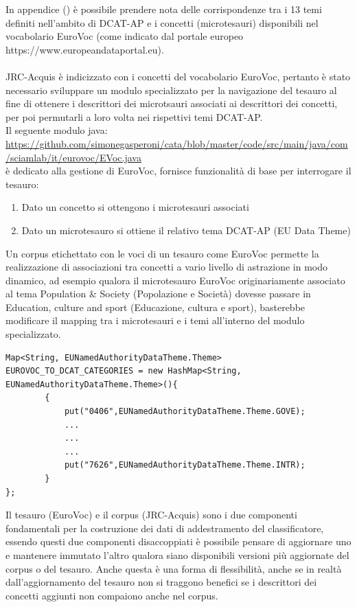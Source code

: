 \documentclass{article}
\theoremstyle{plain}
\theoremstyle{definition}
\begin{document}
In appendice () è possibile prendere nota delle corrispondenze tra i 13 temi definiti nell'ambito di DCAT-AP e i concetti (microtesauri) disponibili nel vocabolario EuroVoc (come indicato dal portale europeo https://www.europeandataportal.eu).
\\
\\
JRC-Acquis è indicizzato con i concetti del vocabolario EuroVoc, pertanto è stato necessario sviluppare un modulo specializzato per la navigazione del tesauro al fine di ottenere i descrittori dei microtsauri associati ai descrittori dei concetti, per poi permutarli a loro volta nei rispettivi temi DCAT-AP.
\\
Il seguente modulo java:
\url{https://github.com/simonegasperoni/cata/blob/master/code/src/main/java/com/sciamlab/it/eurovoc/EVoc.java}
\\
è dedicato alla gestione di EuroVoc, fornisce funzionalità di base per interrogare il tesauro:
\begin{enumerate}
\item Dato un concetto si ottengono i microtesauri associati
\item Dato un microtesauro si ottiene il relativo tema DCAT-AP (EU Data Theme) 
\end{enumerate}

Un corpus etichettato con le voci di un tesauro come EuroVoc permette la realizzazione di associazioni tra concetti a vario livello di astrazione in modo dinamico, ad esempio qualora il microtesauro EuroVoc  originariamente associato al tema Population \& Society (Popolazione e Società) dovesse passare in Education, culture and sport (Educazione, cultura e sport), basterebbe modificare il mapping tra i microtesauri e i temi all'interno del modulo specializzato.
\begin{lstlisting}
Map<String, EUNamedAuthorityDataTheme.Theme> EUROVOC_TO_DCAT_CATEGORIES = new HashMap<String, EUNamedAuthorityDataTheme.Theme>(){
		{
			put("0406",EUNamedAuthorityDataTheme.Theme.GOVE); 		
			...
			...
			...
			put("7626",EUNamedAuthorityDataTheme.Theme.INTR); 	
		}
};
\end{lstlisting}

Il tesauro (EuroVoc) e il corpus (JRC-Acquis) sono i due componenti fondamentali per la costruzione dei dati di addestramento del classificatore, essendo questi due componenti disaccoppiati è possibile pensare di aggiornare uno e mantenere immutato l'altro qualora siano disponibili versioni più aggiornate del corpus o del tesauro. Anche questa è una forma di flessibilità, anche se in realtà dall'aggiornamento del tesauro non si traggono benefici se i descrittori dei concetti aggiunti non compaiono anche nel corpus. 
\newpage
\end{document}

